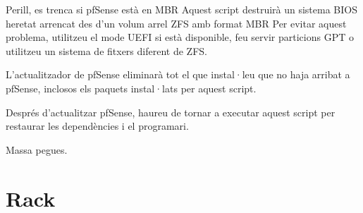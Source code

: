 \documentclass[
  10pt,
]{krantz}
\begin{document}
Perill, es trenca si pfSense està en MBR Aquest script destruirà un sistema BIOS heretat arrencat des d'un volum arrel ZFS amb format MBR Per evitar aquest problema, utilitzeu el mode UEFI si està disponible, feu servir particions GPT o utilitzeu un sistema de fitxers diferent de ZFS.

L'actualitzador de pfSense eliminarà tot el que instal·leu que no haja arribat a pfSense, inclosos els paquets instal·lats per aquest script.

Després d'actualitzar pfSense, haureu de tornar a executar aquest script per restaurar les dependències i el programari.

Massa pegues.

\hypertarget{rack}{%
\chapter{Rack}\label{rack}}

  
\end{document}
